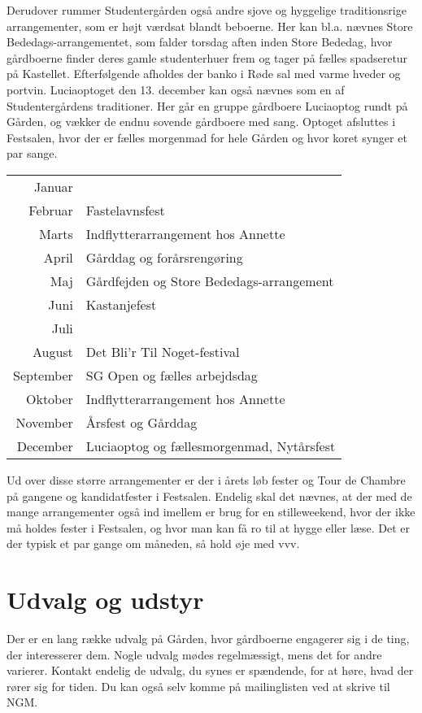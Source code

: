 \documentclass[11pt,article,twoside,openany,danish,extrafontsizes]{memoir} %
\begin{document}
Derudover rummer Studentergården også andre sjove og hyggelige traditionsrige arrangementer, som er højt værdsat blandt beboerne. Her kan bl.a. nævnes Store Bededags-arrangementet, som falder torsdag aften inden Store Bededag, hvor gårdboerne finder deres gamle studenterhuer frem og tager på fælles spadseretur på Kastellet. Efterfølgende afholdes der banko i Røde sal med varme hveder og portvin. Luciaoptoget den 13. december kan også nævnes som en af Studentergårdens traditioner. Her går en gruppe gårdboere Luciaoptog rundt på Gården, og vækker de endnu sovende gårdboere med sang. Optoget afsluttes i Festsalen, hvor der er fælles morgenmad for hele Gården og hvor koret synger et par sange.

\bigskip

\begin{shaded}
\begin{tabular}{>{\sffamily}r l}
Januar				& \\
Februar				& Fastelavnsfest \\
Marts				& Indflytterarrangement hos Annette \\
April				& Gårddag og forårsrengøring \\
Maj					& Gårdfejden og Store Bededags-arrangement \\
Juni				& Kastanjefest \\
Juli				& \\
August				& Det Bli’r Til Noget-festival \\
September			& SG Open og fælles arbejdsdag \\
Oktober				& Indflytterarrangement hos Annette \\
November			& Årsfest og Gårddag \\
December			& Luciaoptog og fællesmorgenmad, Nytårsfest \\
\end{tabular}
\end{shaded}

\bigskip

Ud over disse større arrangementer er der i årets løb fester og Tour de Chambre på gangene og kandidatfester i Festsalen. Endelig skal det nævnes, at der med de mange arrangementer også ind imellem er brug for en stilleweekend, hvor der ikke må holdes fester i Festsalen, og hvor man kan få ro til at hygge eller læse. Det er der typisk et par gange om måneden, så hold øje med vvv.


\section{Udvalg og udstyr}
Der er en lang række udvalg på Gården, hvor gårdboerne engagerer sig i de ting, der interesserer dem. Nogle udvalg mødes regelmæssigt, mens det for andre varierer. Kontakt endelig de udvalg, du synes er spændende, for at høre, hvad der rører sig for tiden. Du kan også selv komme på mailinglisten ved at skrive til NGM.
\end{document}
